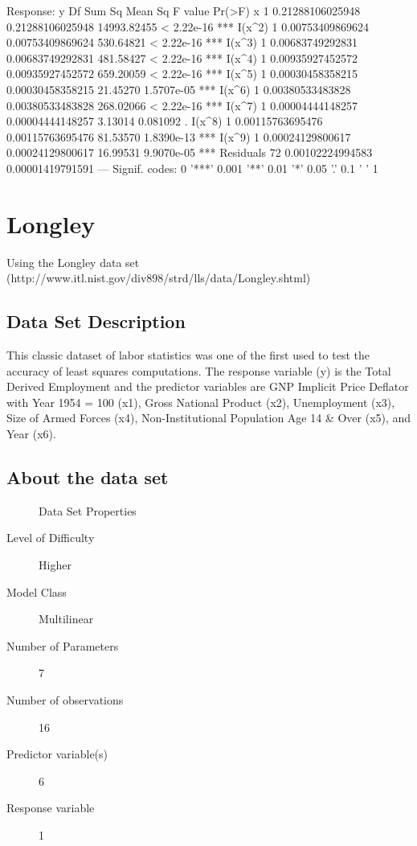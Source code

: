 \documentclass[10pt]{article}
\begin{document}
\begin{Schunk}
\begin{Soutput}
Response: y
          Df           Sum Sq          Mean Sq     F value     Pr(>F)    
x          1 0.21288106025948 0.21288106025948 14993.82455 < 2.22e-16 ***
I(x^2)     1 0.00753409869624 0.00753409869624   530.64821 < 2.22e-16 ***
I(x^3)     1 0.00683749292831 0.00683749292831   481.58427 < 2.22e-16 ***
I(x^4)     1 0.00935927452572 0.00935927452572   659.20059 < 2.22e-16 ***
I(x^5)     1 0.00030458358215 0.00030458358215    21.45270 1.5707e-05 ***
I(x^6)     1 0.00380533483828 0.00380533483828   268.02066 < 2.22e-16 ***
I(x^7)     1 0.00004444148257 0.00004444148257     3.13014   0.081092 .  
I(x^8)     1 0.00115763695476 0.00115763695476    81.53570 1.8390e-13 ***
I(x^9)     1 0.00024129800617 0.00024129800617    16.99531 9.9070e-05 ***
Residuals 72 0.00102224994583 0.00001419791591                           
---
Signif. codes:  0 '***' 0.001 '**' 0.01 '*' 0.05 '.' 0.1 ' ' 1
\end{Soutput}
\end{Schunk}



\section{Longley}
Using the Longley data set (http://www.itl.nist.gov/div898/strd/lls/data/Longley.shtml)

\subsection*{Data Set Description}
This classic dataset of labor statistics was one of the first used to test the 
accuracy of least squares computations. The response variable (y) is the 
Total Derived Employment and the predictor variables are GNP Implicit Price Deflator 
with Year 1954 = 100 (x1), Gross National Product (x2), Unemployment (x3), 
Size of Armed Forces (x4), Non-Institutional Population Age 14 \& Over (x5), 
and Year (x6).


\subsection*{About the data set}

\begin{description}
   \item[]Data Set Properties
   \item[Level of Difficulty] Higher
   \item[Model Class] Multilinear
   \item[Number of Parameters] 7
   \item[Number of observations] 16
   \item[Predictor variable(s)] 6
   \item[Response variable] 1
\end{description}
\end{document}
